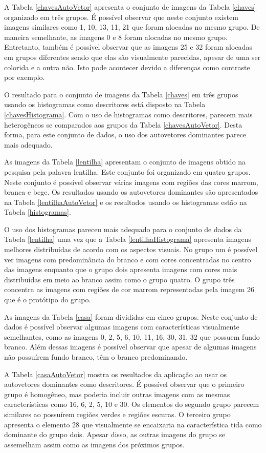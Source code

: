 A Tabela \ref{chavesAutoVetor} apresenta o conjunto de imagens da Tabela \ref{chaves} organizado em três grupos. É possível observar que neste conjunto existem imagens similares como 1, 10, 13, 11, 21 que foram alocadas no mesmo grupo. De maneira semelhante, as imagens 0 e 8 foram alocadas no mesmo grupo. Entretanto, também é possível observar que as imagens 25 e 32 foram alocadas em grupos diferentes sendo que elas são visualmente parecidas, apesar de uma ser colorida e a outra não. Isto pode acontecer devido a diferenças como contraste por exemplo.

O resultado para o conjunto de imagens da Tabela \ref{chaves} em três grupos usando os histogramas como descritores está disposto na Tabela \ref{chavesHistograma}. Com o uso de histogramas como descritores, parecem mais heterogêneos se comparados aos grupos da Tabela \ref{chavesAutoVetor}. Desta forma, para este conjunto de dados, o uso dos autovetores dominantes parece mais adequado.

As imagens da Tabela \ref{lentilha} apresentam o conjunto de imagens obtido na pesquisa pela palavra lentilha. Este conjunto foi organizado em quatro grupos. Neste conjunto é possível observar várias imagens com regiões das cores marrom, branca e bege. Os resultados usando os autovetores dominantes são apresentados na Tabela \ref{lentilhaAutoVetor} e os resultados usando os histogramas estão na Tabela \ref{histogramas}.

O uso dos histogramas pareceu mais adequado para o conjunto de dados da Tabela \ref{lentilha} uma vez que a Tabela \ref{lentilhaHistograma} apresenta imagens melhores distribuídas de acordo com os aspectos visuais. No grupo um é possível ver imagens com predominância do branco e com cores concentradas no centro das imagens enquanto que o grupo dois apresenta imagens com cores mais distribuídas em meio ao branco assim como o grupo quatro. O grupo três concentra as imagens com regiões de cor marrom representadas pela imagem 26 que é o protótipo do grupo.

As imagens da Tabela \ref{casa} foram divididas em cinco grupos. Neste conjunto de dados é possível observar algumas imagens com características visualmente semelhantes, como as imagens 0, 2, 5, 6, 10, 11, 16, 30, 31, 32 que possuem fundo branco. Além dessas imagens é possível observar que apesar de algumas imagens não possuírem fundo branco, têm o branco predominando.

A Tabela \ref{casaAutoVetor} mostra os resultados da aplicação ao usar os autovetores dominantes como descritores. É possível observar que o primeiro grupo é homogêneo, mas poderia incluir outras imagens com as mesmas características como 16, 6, 2, 5, 10 e 30. Os elementos do segundo grupo parecem similares ao possuírem regiões verdes e regiões escuras. O terceiro grupo apresenta o elemento 28 que visualmente se encaixaria na característica tida como dominante do grupo dois. Apesar disso, as outras imagens do grupo se assemelham assim como as imagens dos próximos grupos.

